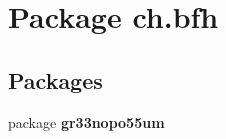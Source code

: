 \section{Package ch.\+bfh}
\label{namespacech_1_1bfh}
\subsection*{Packages}
\begin{DoxyCompactItemize}
\item 
package {\bf gr33nopo55um}
\end{DoxyCompactItemize}
